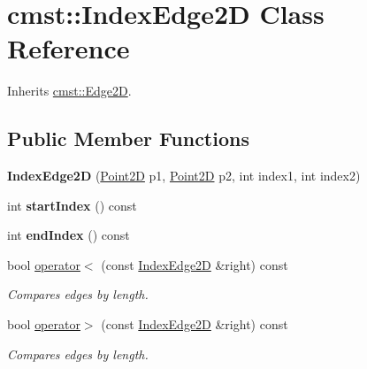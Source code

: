 \hypertarget{classcmst_1_1_index_edge2_d}{}\section{cmst\+:\+:Index\+Edge2D Class Reference}
\label{classcmst_1_1_index_edge2_d}


Inherits \hyperlink{classcmst_1_1_edge2_d}{cmst\+::\+Edge2D}.

\subsection*{Public Member Functions}
\begin{DoxyCompactItemize}
\item 
{\bfseries Index\+Edge2D} (\hyperlink{classcmst_1_1_point2_d}{Point2D} p1, \hyperlink{classcmst_1_1_point2_d}{Point2D} p2, int index1, int index2)\hypertarget{classcmst_1_1_index_edge2_d_aa01ca9e529a319fffb5f500ab7218ef6}{}\label{classcmst_1_1_index_edge2_d_aa01ca9e529a319fffb5f500ab7218ef6}

\item 
int {\bfseries start\+Index} () const \hypertarget{classcmst_1_1_index_edge2_d_ab92c0b814ea9c354a71acfc84c871f72}{}\label{classcmst_1_1_index_edge2_d_ab92c0b814ea9c354a71acfc84c871f72}

\item 
int {\bfseries end\+Index} () const \hypertarget{classcmst_1_1_index_edge2_d_ad50c559d38e5857c03be255774deff12}{}\label{classcmst_1_1_index_edge2_d_ad50c559d38e5857c03be255774deff12}

\item 
bool \hyperlink{classcmst_1_1_index_edge2_d_a96fc8ab0bb52c8c3aa8d5eed3a0034dd}{operator$<$} (const \hyperlink{classcmst_1_1_index_edge2_d}{Index\+Edge2D} \&right) const \hypertarget{classcmst_1_1_index_edge2_d_a96fc8ab0bb52c8c3aa8d5eed3a0034dd}{}\label{classcmst_1_1_index_edge2_d_a96fc8ab0bb52c8c3aa8d5eed3a0034dd}

\begin{DoxyCompactList}\small\item\em Compares edges by length. \end{DoxyCompactList}\item 
bool \hyperlink{classcmst_1_1_index_edge2_d_a9b0f6b17a930986f99d30e03c34905c8}{operator$>$} (const \hyperlink{classcmst_1_1_index_edge2_d}{Index\+Edge2D} \&right) const \hypertarget{classcmst_1_1_index_edge2_d_a9b0f6b17a930986f99d30e03c34905c8}{}\label{classcmst_1_1_index_edge2_d_a9b0f6b17a930986f99d30e03c34905c8}

\begin{DoxyCompactList}\small\item\em Compares edges by length. \end{DoxyCompactList}\end{DoxyCompactItemize}
